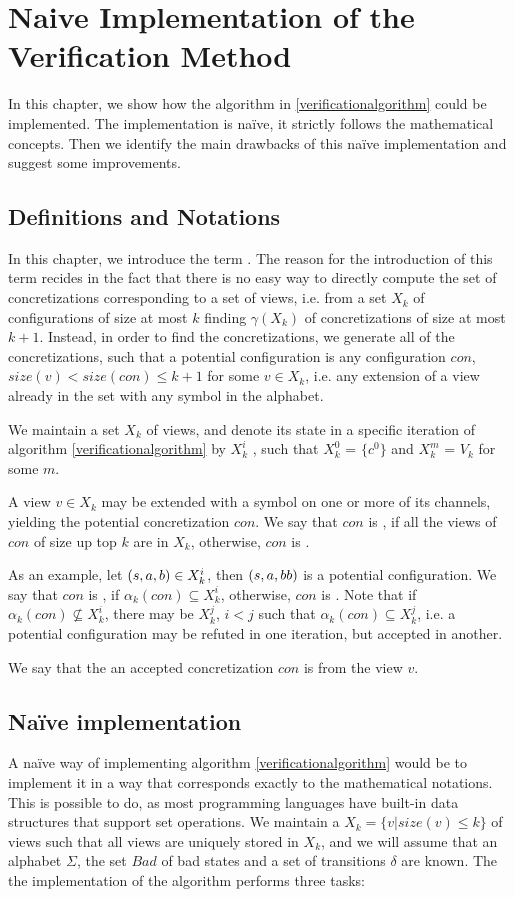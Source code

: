 \section{Naive Implementation of the Verification Method}
\label{naive}
In this chapter, we show how the algorithm in \ref{verificationalgorithm} could be implemented. The implementation is naïve, it strictly follows the mathematical concepts. Then we identify the main drawbacks of this naïve implementation and suggest some improvements.

\subsection{Definitions and Notations}
In this chapter, we introduce the term . The reason for the introduction of this term recides in the fact that there is no easy way to directly compute the set of concretizations corresponding to a set of views, i.e. from a set $X_k$ of configurations of size at most $k$ finding $\gamma(X_k)$ of concretizations of size at most $k+1$. Instead, in order to find the concretizations, we generate all of the  concretizations, such that a potential configuration is any configuration $con$, $size(v) < size(con) \leq k+1$ for some $v \in X_k$, i.e. any extension of a view already in the set with any symbol in the alphabet.

We maintain a set $X_k$ of views, and denote its state in a specific iteration of algorithm \ref{verificationalgorithm} by $X_k^i$ , such that $X_k^0$ = $\{c^0\}$ and $X_k^m$ = $V_k$ for some $m$.
 
A view $v\in X_k$ may be extended with a symbol on one or more of its channels, yielding the potential concretization $con$. We say that $con$ is , if all the views of $con$ of size up top $k$ are in $X_k$, otherwise, $con$ is . 

As an example, let $(s, a, b) \in X_k^i$, then $(s, a, bb)$ is a potential configuration. We say that $con$ is , if $\alpha_k(con) \subseteq X_k^i$, otherwise, $con$ is . Note that if $\alpha_k(con) \not\subseteq X_k^i$, there may be $X_k^j$, $i < j$ such that $\alpha_k(con) \subseteq X_k^j$, i.e. a potential configuration may be refuted in one iteration, but accepted in another.

We say that the an accepted concretization $con$ is  from the view $v$.

\subsection{Naïve implementation}
\label{apost}
A naïve way of implementing algorithm \ref{verificationalgorithm} would be to implement it in a way that corresponds exactly to the mathematical notations. This is possible to do, as most programming languages have built-in data structures that support set operations. We maintain a  $X_k = \{v | size(v) \leq k\}$ of views such that all views are uniquely stored in $X_k$, and we will assume that an alphabet $\Sigma$, the set $Bad$ of bad states and a set of transitions $\delta$ are known. The the implementation of the algorithm performs three tasks:

